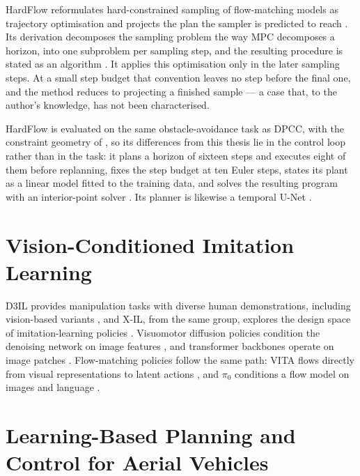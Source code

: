 HardFlow reformulates hard-constrained sampling of flow-matching models as trajectory optimisation and
projects the plan the sampler is predicted to reach \parencite{li2025hardflow}. Its derivation
decomposes the sampling problem the way \ac{MPC} decomposes a horizon, into one subproblem per
sampling step, and the resulting procedure is stated as an algorithm
\parencite[Alg.~1]{li2025hardflow}. It applies this optimisation only in the later sampling steps. At
a small step budget that convention leaves no step before the final one, and the method reduces to
projecting a finished sample --- a case that, to the author's knowledge, has not been characterised.

HardFlow is evaluated on the same obstacle-avoidance task as \ac{DPCC}, with the constraint geometry
of \parencite{romer2025diffusion}, so its differences from this thesis lie in the control loop rather
than in the task: it plans a horizon of sixteen steps and executes eight of them before replanning,
fixes the step budget at ten Euler steps, states its plant as a linear model fitted to the training
data, and solves the resulting program with an interior-point solver
\parencite[App.~C]{li2025hardflow}. Its planner is likewise a temporal U-Net
\parencite{janner2022planning}.

\section{Vision-Conditioned Imitation Learning}\label{sec:rel:visual}

D3IL provides manipulation tasks with diverse human demonstrations, including vision-based variants
\parencite{jia2024towards}, and X-IL, from the same group, explores the design space of
imitation-learning policies \parencite{jia2025xil}. Visuomotor diffusion policies condition the
denoising network on image features \parencite{chi2023diffusion}, and transformer backbones operate
on image patches \parencite{peebles2022dit}. Flow-matching policies follow the same path: VITA flows
directly from visual representations to latent actions \parencite{gao2025vita}, and $\pi_0$ conditions
a flow model on images and language \parencite{black2024pi0}.

\section{Learning-Based Planning and Control for Aerial Vehicles}\label{sec:rel:aerial}

